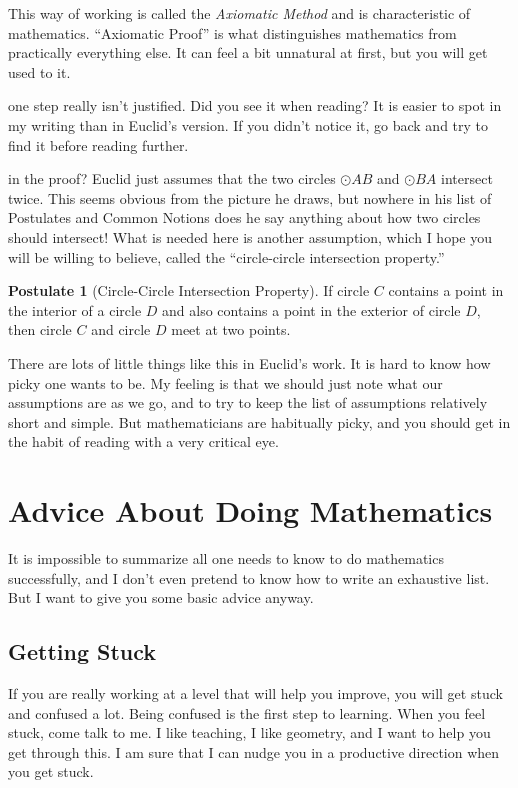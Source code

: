 \documentclass{tufte-handout}
\theoremstyle{definition}
\newtheorem*{postulate}{Postulate}
\begin{document}
This way of working is called the \emph{Axiomatic Method} and is characteristic of mathematics.
``Axiomatic Proof'' is what distinguishes mathematics from practically everything else.
It can feel a bit unnatural at first, but you will get used to it.

 one step really isn't justified.
Did you see it when reading?
It is easier to spot in my writing than in Euclid's version.
If you didn't notice it, go back and try to find it before reading further. \\

\vfill
\pagebreak

 in the proof?
Euclid just assumes that the two circles $\odot AB$ and $\odot BA$ intersect twice.
This seems obvious from the picture he draws, but nowhere in his list of Postulates and Common Notions does he say anything about how two circles should intersect!
What is needed here is another assumption, which I hope you will be willing to believe, called the ``circle-circle intersection property.''
\begin{postulate}[Circle-Circle Intersection Property]
If circle $C$ contains a point in the interior of a circle $D$ and also contains a point in the exterior of circle $D$, then circle $C$ and circle $D$ meet at two points.
\end{postulate}

There are lots of little things like this in Euclid's work.
It is hard to know how picky one wants to be.
My feeling is that we should just note what our assumptions are as we go, and to try to keep the list of assumptions relatively short and simple.
But mathematicians are habitually picky, and you should get in the habit of reading with a very critical eye.


\section*{Advice About Doing Mathematics}
 It is impossible to summarize all one needs to know to do mathematics successfully, and I don't even pretend to know how to write an exhaustive list.
 But I want to give you some basic advice anyway.

\subsection*{Getting Stuck}
If you are really working at a level that will help you improve, you will get stuck and confused a lot.
Being confused is the first step to learning.
When you feel stuck, come talk to me.
I like teaching, I like geometry, and I want to help you get through this.
I am sure that I can nudge you in a productive direction when you get stuck.
\end{document}
